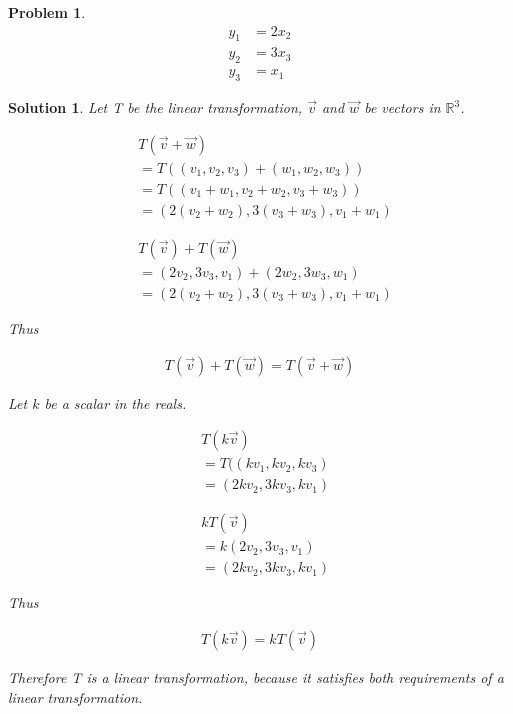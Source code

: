 \documentclass{article}
\newtheorem{problem}{Problem}
\newtheorem*{solution}{Solution}
\begin{document}
\begin{problem}

\begin{align*}
y_{1} &= 2x_{2} \\
y_{2} &= 3x_{3}  \\
y_{3} &= x_{1}
\end{align*}

\end{problem}

\begin{solution}
Let T be the linear transformation, $\vec{v}$ and $\vec{w}$ be vectors in $\mathbb{R}^{3}$.

\begin{align*}
& T(\vec{v} + \vec{w}) \\ 
&= T((v_{1}, v_{2}, v_{3}) + (w_{1}, w_{2}, w_{3})) \\
&= T((v_{1} + w_{1}, v_{2} + w_{2}, v_{3} + w_{3})) \\
&= (2(v_{2} + w_{2}), 3(v_{3} + w_{3}), v_{1} + w_{1})
\end{align*}

\begin{align*}
& T(\vec{v}) + T(\vec{w}) \\
&= (2v_{2}, 3v_{3}, v_{1}) + (2w_{2}, 3w_{3}, w_{1}) \\
&= (2(v_{2} + w_{2}), 3(v_{3} + w_{3}), v_{1} + w_{1})
\end{align*}

Thus

\begin{align*}
T(\vec{v}) + T(\vec{w}) = T(\vec{v} + \vec{w})
\end{align*}

Let $k$ be a scalar in the reals.

\begin{align*}
& T(k\vec{v}) \\
&= T((kv_{1}, kv_{2}, kv_{3}) \\
&= (2kv_{2}, 3kv_{3}, kv_{1}) 
\end{align*}

\begin{align*}
& kT(\vec{v}) \\
&= k(2v_{2}, 3v_{3}, v_{1}) \\
&= (2kv_{2}, 3kv_{3}, kv_{1})
\end{align*}

Thus 

\begin{align*}
T(k\vec{v}) = kT(\vec{v})
\end{align*}

Therefore T is a linear transformation, because it satisfies both requirements of a linear transformation.

\end{solution}
\end{document}
